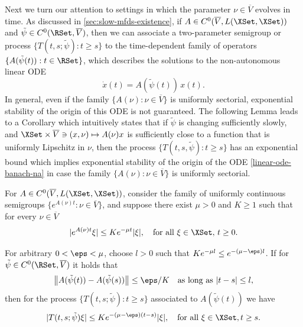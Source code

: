 \documentclass[a4paper]{siamart190516}
\begin{document}
 Next we turn our attention to settings in which the parameter $\nu \in \overline{V}$
 evolves in time. As discussed in \cref{sec:slow-mfds-existence}, if $A \in
 C^0(\overline{V},L(\XSet,\XSet))$ and $\tilde{\psi} \in C^0(\RSet, \overline{V})$,
 then we can associate a two-parameter semigroup or process $\{ T(t,s ;
 \tilde{\psi}): t \geq s \}$ to the time-dependent family of operators
 $\{A(\tilde{\psi}(t)): t \in \RSet \}$, which describes the solutions to the
 non-autonomous linear ODE
 \begin{equation}\label{linear-ode-banach-na}
 \dot{x}(t) = A(\tilde{\psi}(t)) \, x(t).
 \end{equation}
 In general, even if the family $\{ A(\nu) : \nu \in \overline{V} \}$ is uniformly sectorial, exponential stability of the origin of this ODE is not guaranteed. The following Lemma leads to a Corollary which intuitively states that if $\tilde{\psi}$ is changing sufficiently slowly, and $\XSet \times \overline{V} \ni (x,\nu) \mapsto A(\nu) x$ is sufficiently close to a function that is uniformly Lipschitz in $\nu$, then the process $\{ T(t,s,\tilde{\psi}): t \geq s \}$ has an exponential bound which implies exponential stability of the origin of the ODE \cref{linear-ode-banach-na} in case the family $\{ A(\nu) : \nu \in \overline{V} \}$ is uniformly sectorial.
 
  \begin{lemma}\label{lem:un-bounds-stable-process}
For $A \in C^0(\overline{V},L(\XSet,\XSet))$, consider the family of uniformly continuous semigroups $\{ e^{A(\nu)t} : \nu \in \overline{V} \}$, and suppose there exist $\mu > 0$ and $K \geq 1$ such that for every $\nu \in \overline{V}$
 \[
 | e^{A(\nu)t} \xi | \leq K e^{-\mu t} |\xi|, \quad \text{for all } \xi \in \XSet,  \, t \geq 0.
 \]
 
For arbitrary $0 < \eps < \mu$, choose $l > 0$ such that $K e^{-\mu l }  \leq e^{-(\mu - \eps) l }$. If for $\tilde{\psi} \in C^0(\RSet, \overline{V})$ it holds that
\[
\left\|  A(\tilde{\psi}(t)) - A(\tilde{\psi}(s)) \right\|   \leq  \eps / K \quad \text{as long as } |t-s| \leq l,
\] 
 then for the process $\{ T(t,s ; \tilde{\psi}): t \geq s \}$ associated to $A(\tilde{\psi}(t))$ we have
 \[
 | T(t,s ; \tilde{\psi}) \xi | \leq K e^{-(\mu - \eps) (t-s) } |\xi|, \quad \text{for all } \xi \in \XSet, t \geq s.
 \]
 \end{lemma}
 
\end{document}
